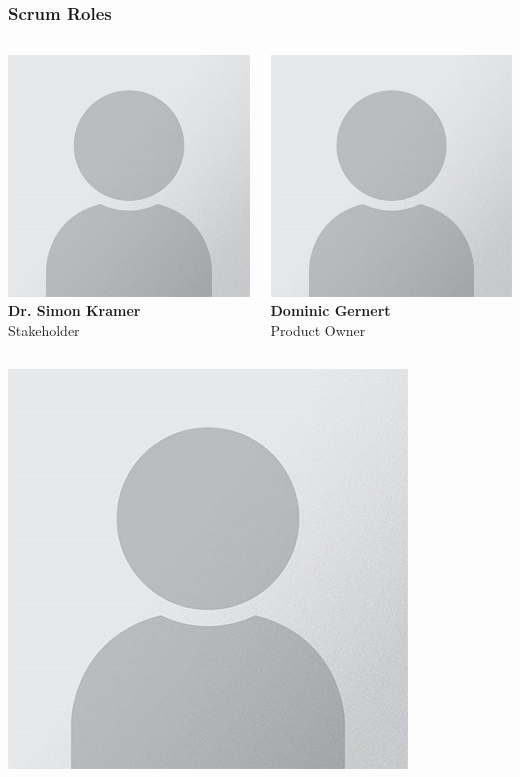 \begin{frame}
    \frametitle{Scrum Roles}
    \begin{columns}
        \centering
        \includegraphics[width=0.45\linewidth]{../assets/avatar_placeholder.jpg} \\
        \textbf{Dr. Simon Kramer} \\ \small{Stakeholder} \par\vspace{0.5cm}
        \centering
        \includegraphics[width=0.45\linewidth]{../assets/avatar_placeholder.jpg} \\
        \textbf{Dominic Gernert} \\ \small{Product Owner} \par\vspace{0.5cm}
    \end{columns}
    \begin{columns}
        \centering
        \includegraphics[width=0.45\linewidth]{../assets/avatar_placeholder.jpg} \\

\end{columns}
\end{frame}
